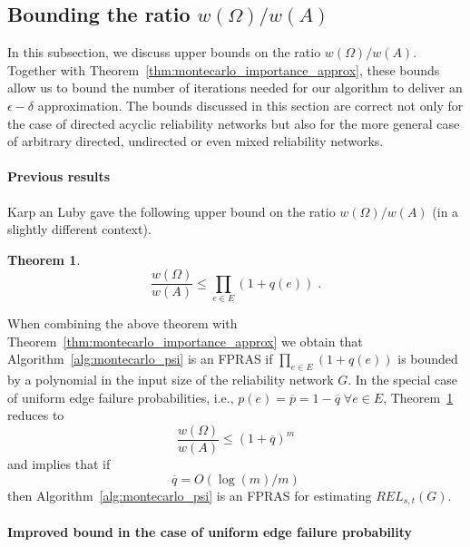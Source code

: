 \documentclass{article}
\newtheorem{theorem}{Theorem}
\begin{document}
\subsection{Bounding the ratio \texorpdfstring{{$w(\Omega)/w(A)$}}{$w(\Omega)/w(A)$}}\label{subsec:ratio_bounds}

In this subsection, we discuss upper bounds on the ratio
$w(\Omega)/w(A)$. Together with Theorem~\ref{thm:montecarlo_importance_approx},
these bounds allow us to bound the
number of iterations needed for our algorithm to deliver an
$\epsilon-\delta$ approximation.
The bounds discussed in this
section are correct not only for the case of directed acyclic
reliability networks but also for the more general case
of arbitrary directed, undirected or
even mixed reliability networks.

\paragraph{Previous results}

Karp an Luby \cite{karp_1985_montecarlo} gave the following upper bound on
the ratio $w(\Omega)/w(A)$ (in a slightly different context).

\begin{theorem}\label{thm:karp_bound_multiplicities}
\begin{equation*}
\frac{w(\Omega)}{w(A)}\leq \prod_{e\in E}(1+q(e))\;.
\end{equation*}
\end{theorem}

When combining the above theorem with
Theorem~\ref{thm:montecarlo_importance_approx} we obtain that
Algorithm~\ref{alg:montecarlo_psi} is an FPRAS if
$\prod_{e\in E}(1+q(e))$ is bounded by a polynomial in the input size
of the reliability network $G$.
In the special case of uniform edge failure probabilities,
i.e., $p(e)=\overline{p}= 1-\overline{q} \;\forall e\in E$,
Theorem~\ref{thm:karp_bound_multiplicities} reduces to
\begin{equation}\label{eq:karp_bound_multiplicities_uniform}
\frac{w(\Omega)}{w(A)}\leq (1+\overline{q})^m
\end{equation}
and implies that if
\begin{equation}\label{eq:karp_bound_q}
\overline{q}=O(\log(m)/m)
\end{equation}
then Algorithm~\ref{alg:montecarlo_psi} is an FPRAS for
estimating $\mathit{REL}_{s,t}(G)$.

\paragraph{Improved bound in the case
  of uniform edge failure probability}\label{sec:bound}
\end{document}
